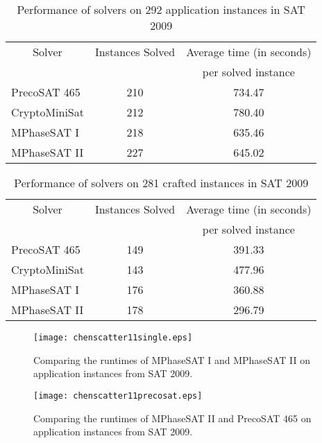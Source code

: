 \documentclass{llncs}
\begin{document}
\begin{table}
\caption{ Performance of solvers on 292 application instances in SAT
2009}
\begin{center}
\renewcommand{\arraystretch}{0.95}
\setlength\tabcolsep{4pt}
\begin{tabular}{l|c|c}
\hline  \hline
\multicolumn{1}{c|}{Solver} & Instances Solved & Average time (in seconds) \\
 & & per solved instance \\
\hline
PrecoSAT 465  &  210 & 734.47 \\
CryptoMiniSat  & 212 & 780.40 \\
MPhaseSAT I   &  218 & 635.46 \\
MPhaseSAT II  &  227 & 645.02 \\
\hline
\end{tabular}
\end{center}
\end{table}

\begin{table}
\caption{ Performance of solvers on 281 crafted instances in SAT
2009}
\begin{center}
\renewcommand{\arraystretch}{0.95}
\setlength\tabcolsep{4pt}
\begin{tabular}{l|c|c}
\hline  \hline
\multicolumn{1}{c|}{Solver} & Instances Solved & Average time (in seconds) \\
 & & per solved instance \\
\hline
PrecoSAT 465  &  149 & 391.33 \\
CryptoMiniSat &  143 & 477.96 \\
MPhaseSAT I   &  176 & 360.88 \\
MPhaseSAT II  &  178 & 296.79 \\
\hline
\end{tabular}
\end{center}
\end{table}


\begin{figure}
\centering
\texttt{[image: chenscatter11single.eps]}
\caption{Comparing the runtimes of MPhaseSAT I and MPhaseSAT II on
application instances from SAT 2009.} \label{singleFig}
\end{figure}

\begin{figure}
\centering
\texttt{[image: chenscatter11precosat.eps]}
\caption{Comparing the runtimes of MPhaseSAT II and PrecoSAT 465 on
application instances from SAT 2009.} \label{precosatFig}
\end{figure}
\end{document}
